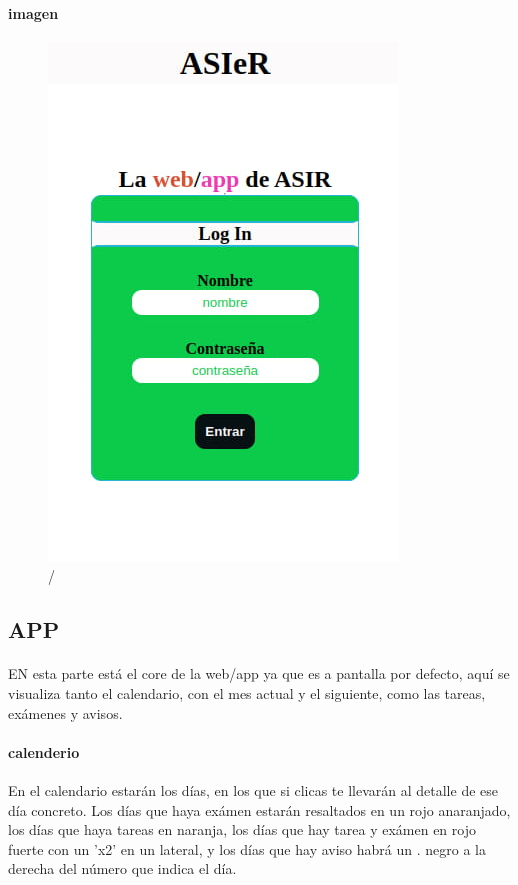 \documentclass[a4paper]{article}
\begin{document}
 \paragraph{imagen}
 \begin{figure}[ht]
    \includegraphics[scale=0.5]{./assets/login.jpg}
    \centering
    \caption{/}
    \label{fig:login}
\end{figure}
\newpage
\subsection[/app]{APP}
\paragraph{}
EN esta parte está el core de la web/app ya que es a pantalla por defecto, aquí se visualiza 
tanto el calendario, con el mes actual y el siguiente, como las tareas, exámenes y avisos.
\paragraph{calenderio}
En el calendario estarán los días, en los que si clicas te llevarán al detalle de ese día concreto.
Los días que haya exámen estarán resaltados en un rojo anaranjado, los días que haya tareas en naranja,
 los días que hay tarea y exámen en rojo fuerte con un 'x2' en un lateral, y los días que hay aviso habrá 
 un . negro a la derecha del número que indica el día.
\end{document}
